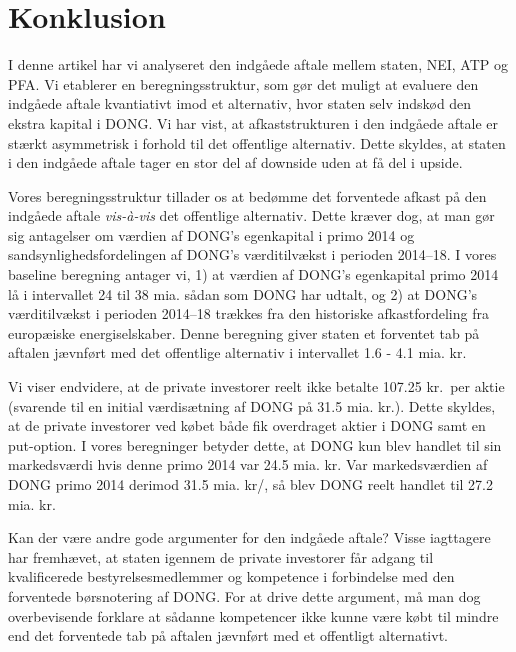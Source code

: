 \documentclass{article}
\begin{document}
\FloatBarrier

\section{Konklusion}

I denne artikel har vi analyseret den indgåede aftale mellem staten, NEI, ATP og PFA. Vi etablerer en beregningsstruktur, som gør det muligt at evaluere den indgåede aftale kvantiativt imod et alternativ, hvor staten selv indskød den ekstra kapital i DONG. Vi har vist, at afkaststrukturen i den indgåede aftale er stærkt asymmetrisk i forhold til det offentlige alternativ. Dette skyldes, at staten i den indgåede aftale tager en stor del af downside uden at få del i upside. 

Vores beregningsstruktur tillader os at bedømme det forventede afkast på den indgåede aftale \emph{vis-\`{a}-vis} det offentlige alternativ. Dette kræver dog, at man gør sig antagelser om værdien af DONG's egenkapital i primo 2014 og sandsynlighedsfordelingen af DONG's  værditilvækst i perioden 2014--18. I vores baseline beregning antager vi, 1) at værdien af DONG's egenkapital primo 2014 lå i intervallet 24 til 38 mia. sådan som DONG har udtalt, og 2) at DONG's  værditilvækst i perioden 2014--18 trækkes fra den historiske afkastfordeling fra europæiske energiselskaber. Denne beregning giver staten et forventet tab på aftalen jævnført med det offentlige alternativ i intervallet 1.6 - 4.1 mia. kr. 

Vi viser endvidere, at de private investorer reelt ikke betalte 107.25 kr.\ per aktie (svarende til en initial værdisætning af DONG på 31.5 mia. kr.). Dette skyldes, at de private investorer ved købet både fik overdraget  aktier i DONG samt en put-option. I vores beregninger betyder dette, at DONG kun blev handlet til sin markedsværdi hvis denne primo 2014 var 24.5 mia. kr. Var markedsværdien af DONG primo 2014 derimod 31.5 mia. kr/, så blev DONG reelt handlet til 27.2 mia. kr.


Kan der være andre gode argumenter for den indgåede aftale? Visse iagttagere har fremhævet, at staten igennem de private investorer får adgang til kvalificerede bestyrelsesmedlemmer og kompetence i forbindelse med den forventede børsnotering af DONG. For at drive dette argument, må man dog overbevisende forklare at sådanne kompetencer ikke kunne være købt til mindre end  det forventede tab på aftalen jævnført med et offentligt alternativt. %
\end{document}
